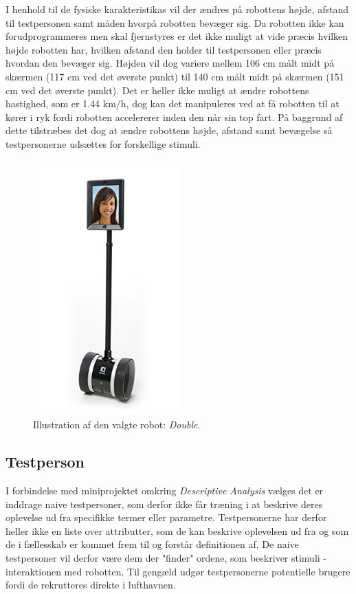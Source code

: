 I henhold til de fysiske karakteristikas vil der ændres på robottens højde, afstand til testpersonen samt måden hvorpå robotten bevæger sig. Da robotten ikke kan forudprogrammeres men skal fjernstyres er det ikke muligt at vide præcis hvilken højde robotten har, hvilken afstand den holder til testpersonen eller præcis hvordan den bevæger sig. Højden vil dog variere mellem 106 cm målt midt på skærmen (117 cm ved det øverste punkt) til 140 cm målt midt på skærmen (151 cm ved det øverste punkt). Det er heller ikke muligt at ændre robottens hastighed, som er 1.44 km/h, dog kan det manipuleres ved at få robotten til at kører i ryk fordi robotten accelererer inden den når sin top fart. På baggrund af dette tilstræbes det dog at ændre robottens højde, afstand samt bevægelse så testpersonerne udsættes for forskellige stimuli. 
%
\begin{figure}[H]
\centering
\includegraphics[width = 0.5\textwidth]{Figure/Double} 
\caption{Illustration af den valgte robot: \textit{Double}.}
\label{fig:Double}
\end{figure}
\noindent
% 
%

\subsection*{Testperson}
\label{Testpersoner}
%
I forbindelse med miniprojektet omkring \textit{Descriptive Analysis} vælges det er inddrage naive testpersoner, som derfor ikke får træning i at beskrive deres oplevelse ud fra specifikke termer eller parametre. Testpersonerne har derfor heller ikke en liste over  attributter, som de kan beskrive oplevelsen ud fra og som de i fællesskab er kommet frem til og forstår definitionen af. De naive testpersoner vil derfor være dem der "finder" ordene, som beskriver stimuli - interaktionen med robotten. Til gengæld udgør testpersonerne potentielle brugere fordi de rekrutteres direkte i lufthavnen. 

